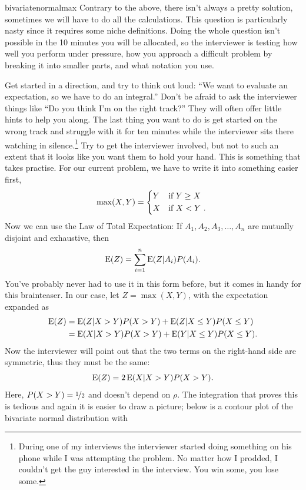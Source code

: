 \begin{answer}{bivariatenormalmax}
Contrary to the above, there isn't always a pretty solution, sometimes we will have to do all the calculations.
This question is particularly nasty since it requires some niche definitions.
Doing the whole question isn't possible in the 10 minutes you will be allocated, so the interviewer is testing how well you perform under pressure,
how you approach a difficult problem by breaking it into smaller parts,
and what notation you use.

Get started in a direction, and try to think out loud:
``We want to evaluate an expectation, so we have to do an integral.''
Don't be afraid to ask the interviewer things like ``Do you think I'm on the right track?''
They will often offer little hints to help you along.
The last thing you want to do is get started on the wrong track and struggle with it for ten minutes while the interviewer sits there watching in silence.\footnote{During one of my interviews the interviewer started doing something on his phone while I was attempting the problem. No matter how I prodded, I couldn't get the guy interested in the interview. You win some, you lose some.}
Try to get the interviewer involved, but not to such an extent that it looks like you want them to hold your hand.
This is something that takes practise.
For our current problem, we have to write it into something easier first,
\[
  \max(X, Y) =
  \begin{dcases*}
    Y & if $Y \geq X$\\
    X & if $X < Y$
  \text{.}
  \end{dcases*}
\]
Now we can use the Law of Total Expectation:
If $ A_1, A_2, A_3, \ldots, A_n$ are mutually disjoint and exhaustive, then
\[
  \operatorname{\mathrm{E}}(Z) = \sum_{i=1}^{n}{
    \operatorname{\mathrm{E}}(Z| A_i)P(A_i)
  }
  \text{.}
\]
You've probably never had to use it in this form before, but it comes in handy for this brainteaser.
In our case, let $Z=\max(X,Y)$, with the expectation expanded as
\begin{align*}
  \operatorname{\mathrm{E}}(Z) &= \operatorname{\mathrm{E}}(Z|X > Y)P(X>Y)
+          \operatorname{\mathrm{E}}(Z|X \leq Y)P(X \leq Y) \\
        &= \operatorname{\mathrm{E}}(X|X > Y)P(X>Y)
+          \operatorname{\mathrm{E}}(Y|X \leq Y)P(X \leq Y)
  \text{.}
\end{align*}
Now the interviewer will point out that the two terms on the right-hand side are symmetric, thus they must be the same:
\[
  \operatorname{\mathrm{E}}(Z) = 2 \operatorname{\mathrm{E}}(X|X > Y)P(X>Y)
  \text{.}
\]
Here, $P(X>Y) = \nicefrac{1}{2}$ and doesn't depend on $\rho$.
The integration that proves this is tedious and again it is easier to draw a picture; below is a contour plot of the bivariate normal distribution with

\end{answer}
